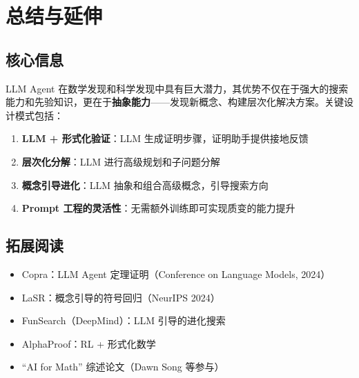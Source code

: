 \section{总结与延伸}

\subsection{核心信息}

LLM Agent 在数学发现和科学发现中具有巨大潜力，其优势不仅在于强大的搜索能力和先验知识，更在于\textbf{抽象能力}——发现新概念、构建层次化解决方案。关键设计模式包括：

\begin{enumerate}
    \item \textbf{LLM + 形式化验证}：LLM 生成证明步骤，证明助手提供接地反馈
    \item \textbf{层次化分解}：LLM 进行高级规划和子问题分解
    \item \textbf{概念引导进化}：LLM 抽象和组合高级概念，引导搜索方向
    \item \textbf{Prompt 工程的灵活性}：无需额外训练即可实现质变的能力提升
\end{enumerate}

\subsection{拓展阅读}
\begin{itemize}
    \item Copra：LLM Agent 定理证明（Conference on Language Models, 2024）
    \item LaSR：概念引导的符号回归（NeurIPS 2024）
    \item FunSearch（DeepMind）：LLM 引导的进化搜索
    \item AlphaProof：RL + 形式化数学
    \item ``AI for Math'' 综述论文（Dawn Song 等参与）
\end{itemize}


